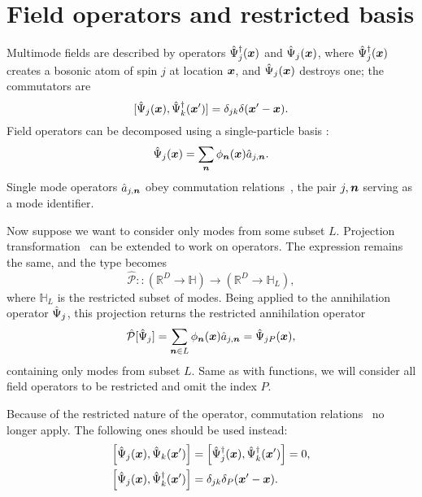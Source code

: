 \section{Field operators and restricted basis}

Multimode fields are described by operators $\hat{\Psi}_j^{\dagger}(\boldsymbol{x})$ and $\hat{\Psi}_j(\boldsymbol{x})$,
where $\hat{\Psi}_j^{\dagger}(\boldsymbol{x})$ creates a bosonic atom of spin $j$ at location $\boldsymbol{x}$,
and $\hat{\Psi}_j(\boldsymbol{x})$ destroys one;
the commutators are
\begin{equation}
\label{eqn:formalism:func-aux:commutators}
	[ \hat{\Psi}_j(\boldsymbol{x}), \hat{\Psi}_k^{\dagger}(\boldsymbol{x}^\prime) ]
	= \delta_{jk} \delta(\boldsymbol{x}^\prime-\boldsymbol{x}).
\end{equation}
Field operators can be decomposed using a single-particle basis :
\[
	\hat{\Psi}_j(\boldsymbol{x}) = \sum_{\boldsymbol{n}} \phi_{\boldsymbol{n}}(\boldsymbol{x}) \hat{a}_{j,\boldsymbol{n}}.
\]
Single mode operators $\hat{a}_{j,\boldsymbol{n}}$ obey commutation relations~,
the pair $j,\boldsymbol{n}$ serving as a mode identifier.

Now suppose we want to consider only modes from some subset $L$.
Projection transformation~ can be extended to work on operators.
The expression remains the same, and the type becomes
\[
	\hat{\mathcal{P}} ::
	(\mathbb{R}^D \rightarrow \mathbb{H}) \rightarrow (\mathbb{R}^D \rightarrow \mathbb{H}_L),
\]
where $\mathbb{H}_L$ is the restricted subset of modes.
Being applied to the annihilation operator $\hat{\Psi}_j$, this projection returns the restricted annihilation operator
\[
	\hat{\mathcal{P}} [\hat{\Psi}_j]
	= \sum_{\boldsymbol{n} \in L} \phi_{\boldsymbol{n}} (\boldsymbol{x}) \hat{a}_{j,\boldsymbol{n}}
	= \hat{\Psi}_{jP} (\boldsymbol{x}),
\]
containing only modes from subset $L$.
Same as with functions, we will consider all field operators to be restricted and omit the index $P$.

Because of the restricted nature of the operator, commutation relations~ no longer apply.
The following ones should be used instead:
\begin{equation}
\label{eqn:formalism:func-aux:restricted-commutators}
\begin{split}
	\left[ \hat{\Psi}_j(\boldsymbol{x}), \hat{\Psi}_k(\boldsymbol{x}^\prime) \right]
	& = \left[ \hat{\Psi}_j^\dagger(\boldsymbol{x}), \hat{\Psi}_k^\dagger(\boldsymbol{x}^\prime) \right] = 0, \\
	\left[ \hat{\Psi}_j(\boldsymbol{x}), \hat{\Psi}_k^\dagger(\boldsymbol{x}^\prime) \right]
	& = \delta_{jk} \delta_P(\boldsymbol{x}^\prime - \boldsymbol{x}).
\end{split}
\end{equation}

